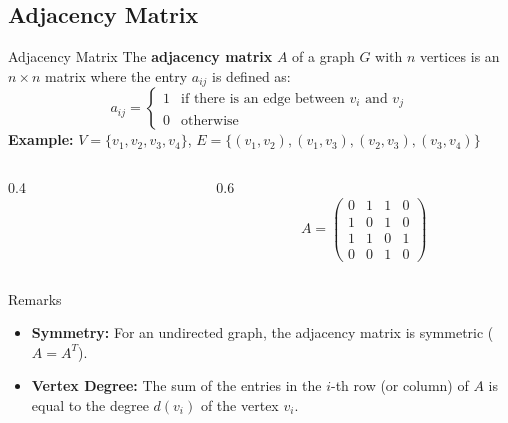 \documentclass{beamer}
\begin{document}
\subsection{Adjacency Matrix}
\begin{frame}[fragile]{Adjacency Matrix}
    The \textbf{adjacency matrix} $A$ of a graph $G$ with $n$ vertices is an $n \times n$ matrix where the entry $a_{ij}$ is defined as:
    \[a_{ij} = \begin{cases} 1 & \text{if there is an edge between } v_i \text{ and } v_j \\ 0 & \text{otherwise} \end{cases}\]
    \vfill
    \textbf{Example:}
    $V = \{v_1, v_2, v_3, v_4\}$, $E = \{(v_1, v_2), (v_1, v_3), (v_2, v_3), (v_3, v_4)\}$
    \begin{columns}
        \begin{column}{0.4\textwidth}
            \begin{center}
            \end{center}
        \end{column}
        \begin{column}{0.6\textwidth}
            \[A = \begin{pmatrix} 0 & 1 & 1 & 0 \\ 1 & 0 & 1 & 0 \\ 1 & 1 & 0 & 1 \\ 0 & 0 & 1 & 0 \end{pmatrix}\]
        \end{column}
    \end{columns}
\end{frame}


\begin{frame}{Remarks}
    \begin{itemize}
        \item \textbf{Symmetry:} For an undirected graph, the adjacency matrix is symmetric ($A = A^T$).
        \item \textbf{Vertex Degree:} The sum of the entries in the $i$-th row (or column) of $A$ is equal to the degree $d(v_i)$ of the vertex $v_i$.
    \end{itemize}
\end{frame}
\end{document}
